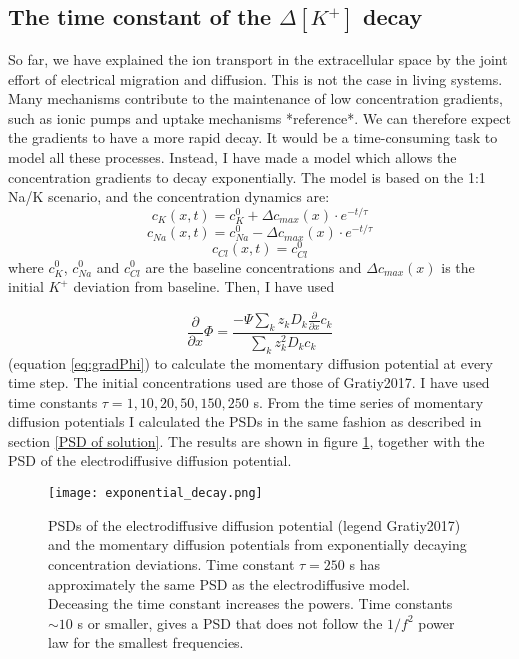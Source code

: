 \documentclass{article}
\begin{document}
\subsection{The time constant of the  $\Delta [K^+]$ decay}\label{exponential decay}
So far, we have explained the ion transport in the extracellular space by the joint effort of electrical migration and diffusion. This is not the case in living systems. Many mechanisms contribute to the maintenance of low concentration gradients, such as ionic pumps and uptake mechanisms *reference*. We can therefore expect the gradients to have a more rapid decay. It would be a time-consuming task to model all these processes. Instead, I have made a model which allows the concentration gradients to decay exponentially. The model is based on the 1:1 Na/K scenario, and the concentration dynamics are:
$$
c_{K}(x,t) = c_{K}^0 +\Delta c_{max}(x) \cdot e^{-t/\tau}
$$
$$
c_{Na}(x,t) = c_{Na}^0 -\Delta c_{max}(x) \cdot e^{-t/\tau}
$$
$$
c_{Cl}(x,t) = c_{Cl}^0
$$
where $c_{K}^0$, $c_{Na}^0$ and $c_{Cl}^0$ are the baseline concentrations and $\Delta c_{max} (x)$ is the initial $K^+$ deviation from baseline.  Then, I have used 


\begin{equation*}
\frac{\partial}{\partial x} \Phi = \frac{-\Psi \sum_k z_k D_k \frac{\partial}{\partial x} c_k}{\sum_k z_k^2 D_k c_k}
\end{equation*}
(equation \ref{eq:gradPhi}) to calculate the momentary diffusion potential at every time step. The initial concentrations used are those of Gratiy2017. I have used time constants $\tau = 1,10,20,50, 150, 250$ s. From the time series of momentary diffusion potentials I calculated the PSDs in the same fashion as described in section \ref{PSD of solution}. The results are shown in figure \ref{fig:exponential_decay}, together with the PSD of the electrodiffusive diffusion potential. 

\begin{figure}
  \texttt{[image: exponential\_decay.png]}
  \caption{PSDs of the electrodiffusive diffusion potential (legend Gratiy2017) and the momentary diffusion potentials from exponentially decaying concentration deviations. Time constant $\tau = 250$ s has approximately the same PSD as the electrodiffusive model. Deceasing the time constant increases the powers. Time constants $\sim 10$ s or smaller, gives a PSD that does not follow the $1/f^2$ power law for the smallest frequencies.}
  \label{fig:exponential_decay}
\end{figure}
\end{document}
